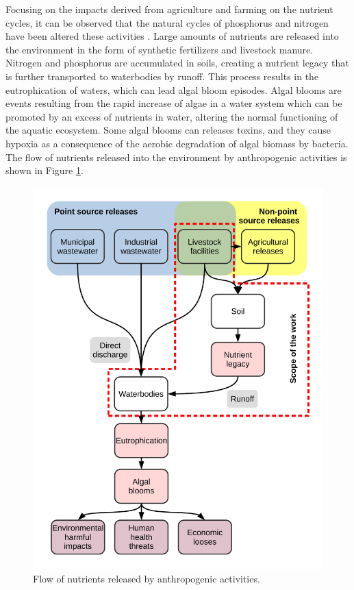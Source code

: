 \begin{refsection}[referencesCh1]
Focusing on the impacts derived from agriculture and farming on the nutrient cycles, it can be observed that the natural cycles of phosphorus and nitrogen have been altered these activities \citep{Bouwman2009}. Large amounts of nutrients are released into the environment in the form of synthetic fertilizers and livestock manure. Nitrogen and phosphorus are accumulated in soils, creating a nutrient legacy that is further transported to waterbodies by runoff. This process results in the eutrophication of waters, which can lead algal bloom episodes. Algal blooms are events resulting from the rapid increase of algae in a water system which can be promoted by an excess of nutrients in water, altering the normal functioning of the aquatic ecosystem. Some algal blooms can releases toxins, and they cause hypoxia as a consequence of the aerobic degradation of algal biomass by bacteria. The flow of nutrients released into the environment by anthropogenic activities is shown in Figure \ref{fig:Ch1NutrientsFlow}. 

\begin{figure}[h]
	\centering
	\includegraphics[width=0.85\linewidth, trim={1cm 1cm 1cm 1cm},clip]{gfx/Chapter1/IntroFig1.pdf} 
	\caption{Flow of nutrients released by anthropogenic activities.}
	\label{fig:Ch1NutrientsFlow}
\end{figure}


\end{refsection}
